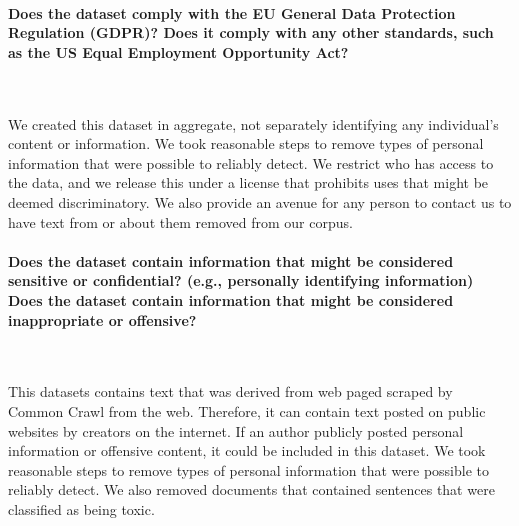 \paragraph{Does the dataset comply with the EU General Data Protection Regulation (GDPR)? Does it comply with any other standards, such as the US Equal Employment Opportunity Act?}~

We created this dataset in aggregate, not separately identifying any individual’s content or information. 
We took reasonable steps to remove types of personal information that were possible to reliably detect. 
We restrict who has access to the data, and we release this under a license that prohibits uses that might be deemed discriminatory. 
We also provide an avenue for any person to contact us to have text from or about them removed from our corpus.


\paragraph{Does the dataset contain information that might be considered sensitive or confidential? (e.g., personally identifying information) Does the dataset contain information that might be considered inappropriate or offensive?}~

This datasets contains text that was derived from web paged scraped by Common Crawl from the web. 
Therefore, it can contain text posted on public websites by creators on the internet. 
If an author publicly posted personal information or offensive content, it could be included in this dataset. 
We took reasonable steps to remove types of personal information that were possible to reliably detect. 
We also removed documents that contained sentences that were classified as being toxic. 

